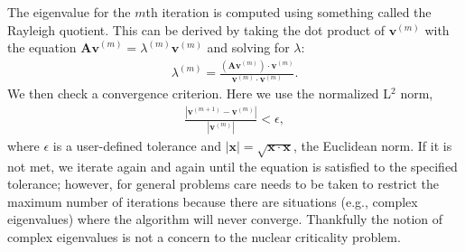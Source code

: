 The eigenvalue for the $m$th iteration is computed using something called the Rayleigh quotient. This can be derived by taking the dot product of $\mathbf{v}^{(m)}$ with the equation $\mathbf{A v}^{(m)} = \lambda^{(m)} \mathbf{v}^{(m)}$ and solving for $\lambda$:
\begin{align}
  \lambda^{(m)} = \frac{ ( \mathbf{A} \mathbf{v}^{(m)} ) \cdot \mathbf{v}^{(m)} }{ \mathbf{v}^{(m)} \cdot  \mathbf{v}^{(m)} } .
\end{align}
We then check a convergence criterion. Here we use the normalized L$^2$ norm,
\begin{align}
  \frac{ | \mathbf{v}^{(m+1)} - \mathbf{v}^{(m)} | }{ | \mathbf{v}^{(m)} |} < \epsilon ,
\end{align}
where $\epsilon$ is a user-defined tolerance and $| \mathbf{x} | = \sqrt{ \mathbf{x} \cdot \mathbf{x} }$, the Euclidean norm. If it is not met, we iterate again and again until the equation is satisfied to the specified tolerance; however, for general problems care needs to be taken to restrict the maximum number of iterations because there are situations (e.g., complex eigenvalues) where the algorithm will never converge. Thankfully the notion of complex eigenvalues is not a concern to the nuclear criticality problem.


